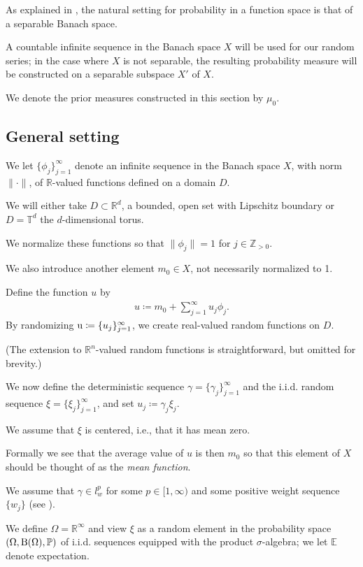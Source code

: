 \documentclass[oneside,11pt]{book}
\numberwithin{equation}{section}
\begin{document}
As explained in \cite[Sect. A.2.2]{Dashti_Stuart2017}, the natural setting for probability in a function space is that of a separable Banach space.

A countable infinite sequence in the Banach space $X$ will be used for our random series; in the case where $X$ is not separable, the resulting probability measure will be constructed on a separable subspace $X'$ of $X$.

We denote the prior measures constructed in this section by $\mu_0$.

\subsection{General setting}
We let $\{\phi_j\}_{j=1}^\infty$ denote an infinite sequence in the Banach space $X$, with norm $\|\cdot\|$, of $\mathbb{R}$-valued functions defined on a domain $D$.

We will either take $D\subset\mathbb{R}^d$, a bounded, open set with Lipschitz boundary or $D = \mathbb{T}^d$ the $d$-dimensional torus.

We normalize these functions so that $\|\phi_j\| = 1$ for $j\in\mathbb{Z}_{> 0}$.

We also introduce another element $m_0\in X$, not necessarily normalized to 1.

Define the function $u$ by
\begin{align}
    \label{random function}
    \tag{rand-func}
    u\coloneqq m_0 + \sum_{j=1}^\infty u_j\phi_j.
\end{align}
By randomizing ${\rm u}\coloneqq\{u_j\}_{j=1}^\infty$, we create real-valued random functions on $D$.

(The extension to $\mathbb{R}^n$-valued random functions is straightforward, but omitted for brevity.)

%
We now define the deterministic sequence $\gamma = \{\gamma_j\}_{j=1}^\infty$ and the i.i.d. random sequence $\xi = \{\xi_j\}_{j=1}^\infty$, and set $u_j\coloneqq\gamma_j\xi_j$.

We assume that $\xi$ is centered, i.e., that it has mean zero.

Formally we see that the average value of $u$ is then $m_0$ so that this element of $X$ should be thought of as the \textit{mean function}.

We assume that $\gamma\in l_w^p$ for some $p\in[1,\infty)$ and some positive weight sequence $\{w_j\}$ (see \cite[Sect. A.1.1]{Dashti_Stuart2017}).

We define $\Omega = \mathbb{R}^\infty$ and view $\xi$ as a random element in the probability space $(\Omega,{\rm B}(\Omega),\mathbb{P})$ of i.i.d. sequences equipped with the product $\sigma$-algebra; we let $\mathbb{E}$ denote expectation.
\end{document}
